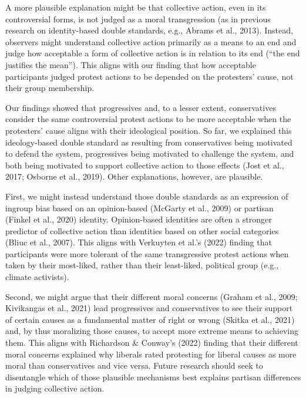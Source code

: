 \documentclass[twocolumn, 11pt, letterpaper]{article}
\begin{document}
A more plausible explanation might be that collective action, even in
its controversial forms, is not judged as a moral transgression (as in
previous research on identity-based double standards, e.g., Abrams et
al., 2013). Instead, observers might understand collective action
primarily as a means to an end and judge how acceptable a form of
collective action is in relation to its end (``the end justifies the
mean''). This aligns with our finding that how acceptable participants
judged protest actions to be depended on the protesters' cause, not
their group membership.

Our findings showed that progressives and, to a lesser extent,
conservatives consider the same controversial protest actions to be more
acceptable when the protesters' cause aligns with their ideological
position. So far, we explained this ideology-based double standard as
resulting from conservatives being motivated to defend the system,
progressives being motivated to challenge the system, and both being
motivated to support collective action to those effects (Jost et al.,
2017; Osborne et al., 2019). Other explanations, however, are plausible.

First, we might instead understand those double standards as an
expression of ingroup bias based on an opinion-based (McGarty et al.,
2009) or partisan (Finkel et al., 2020) identity. Opinion-based
identities are often a stronger predictor of collective action than
identities based on other social categories (Bliuc et al., 2007). This
aligns with Verkuyten et al.'s (2022) finding that participants were
more tolerant of the same transgressive protest actions when taken by
their most-liked, rather than their least-liked, political group (e.g.,
climate activists).

Second, we might argue that their different moral concerns (Graham et
al., 2009; Kivikangas et al., 2021) lead progressives and conservatives
to see their support of certain causes as a fundamental matter of right
or wrong (Skitka et al., 2021) and, by thus moralizing those causes, to
accept more extreme means to achieving them. This aligns with Richardson
\& Conway's (2022) finding that their different moral concerns explained
why liberals rated protesting for liberal causes as more moral than
conservatives and vice versa. Future research should seek to disentangle
which of those plausible mechanisms best explains partisan differences
in judging collective action.
\end{document}
